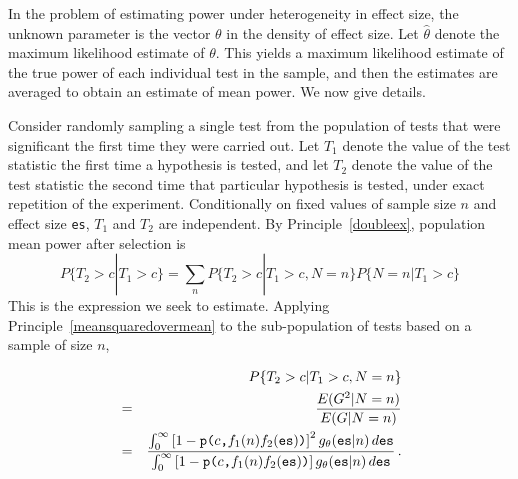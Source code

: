 \documentclass[jou]{apa6} %
\newcommand{\R}[1]{\mbox{\texttt{#1}}} %
\begin{document}
In the problem of estimating power under heterogeneity in effect size, the unknown parameter is the vector $\theta$ in the density of effect size. Let $\widehat{\theta}$ denote the maximum likelihood estimate of $\theta$. This yields a maximum likelihood estimate of the true power of each individual test in the sample, and then the estimates are averaged to obtain an \nopagebreak estimate of mean power. We now give details.

Consider randomly sampling a single test from the population of tests that were significant the first time they were carried out. Let $T_1$ denote the value of the test statistic the first time a hypothesis is tested, and let $T_2$ denote the value of the test statistic the second time that particular hypothesis is tested, under exact repetition of the experiment. Conditionally on fixed values of sample size $n$ and effect size \texttt{es}, $T_1$ and $T_2$ are independent. By Principle~\ref{doubleex}, population mean power after selection is
{\small
\begin{equation} \label{probsig2givensig1}
    P\{ T_2 > c | T_1 > c\} = \sum_n P\{T_2>c | T_1>c, N=n \} P\{N=n|T_1>c\}
\end{equation}
} %
This is the expression we seek to estimate. Applying Principle~\ref{meansquaredovermean} to the sub-population of tests based on a sample of size $n$,

{\small
\begin{eqnarray} \label{ratiogivenN}
    & &    P\{T_2>c | T_1>c, N=n  \} \nonumber \\
    & = & \frac{ E(G^2|N=n) }
                                         { E(G|N=n) }               \nonumber       \\
    & = & \frac{\int_0^\infty\left[1-\R{p(}c\R{,}f_1(n)f_2(\R{es})\R{)}\right]^2
      g_{\theta}(\R{es}|n) \, d\R{es}} 
     {\int_0^\infty\left[1-\R{p(}c\R{,}f_1(n)f_2(\R{es})\R{)}\right]
      g_{\theta}(\R{es}|n) \, d\R{es}} \, .
\end{eqnarray}
} %
\end{document}
